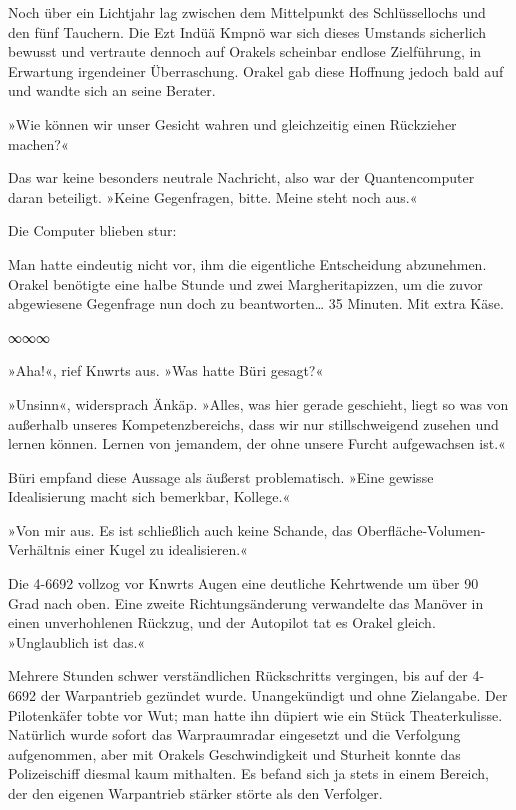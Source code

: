 Noch über ein Lichtjahr lag zwischen dem Mittelpunkt des Schlüssellochs und den fünf Tauchern. Die Ezt Indüä Kmpnö war sich dieses Umstands sicherlich bewusst und vertraute dennoch auf Orakels scheinbar endlose Zielführung, in Erwartung irgendeiner Überraschung. Orakel gab diese Hoffnung jedoch bald auf und wandte sich an seine Berater.

»Wie können wir unser Gesicht wahren und gleichzeitig einen Rückzieher machen?«


Das war keine besonders neutrale Nachricht, also war der Quantencomputer daran beteiligt. »Keine Gegenfragen, bitte. Meine steht noch aus.«

Die Computer blieben stur: 

Man hatte eindeutig nicht vor, ihm die eigentliche Entscheidung abzunehmen. Orakel benötigte eine halbe Stunde und zwei Margheritapizzen, um die zuvor abgewiesene Gegenfrage nun doch zu beantworten… 35 Minuten. Mit extra Käse.

\begin{center}
∞∞∞
\end{center}

»Aha!«, rief Knwrts aus. »Was hatte Büri gesagt?«

»Unsinn«, widersprach Änkäp. »Alles, was hier gerade geschieht, liegt so was von außerhalb unseres Kompetenzbereichs, dass wir nur stillschweigend zusehen und lernen können. Lernen von jemandem, der ohne unsere Furcht aufgewachsen ist.«

Büri empfand diese Aussage als äußerst problematisch. »Eine gewisse Idealisierung macht sich bemerkbar, Kollege.«

»Von mir aus. Es ist schließlich auch keine Schande, das Oberfläche-Volumen-Verhältnis einer Kugel zu idealisieren.«

Die 4-6692 vollzog vor Knwrts Augen eine deutliche Kehrtwende um über 90 Grad nach oben. Eine zweite Richtungsänderung verwandelte das Manöver in einen unverhohlenen Rückzug, und der Autopilot tat es Orakel gleich. »Unglaublich ist das.«

Mehrere Stunden schwer verständlichen Rückschritts vergingen, bis auf der 4-6692 der Warpantrieb gezündet wurde. Unangekündigt und ohne Zielangabe. Der Pilotenkäfer tobte vor Wut; man hatte ihn düpiert wie ein Stück Theaterkulisse. Natürlich wurde sofort das Warpraumradar eingesetzt und die Verfolgung aufgenommen, aber mit Orakels Geschwindigkeit und Sturheit konnte das Polizeischiff diesmal kaum mithalten. Es befand sich ja stets in einem Bereich, der den eigenen Warpantrieb stärker störte als den Verfolger.

